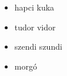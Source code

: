 \begin{itemize}[noitemsep]
    \item hapci kuka
    \item tudor vidor
    \item szendi szundi
    \item morgó
\end{itemize}